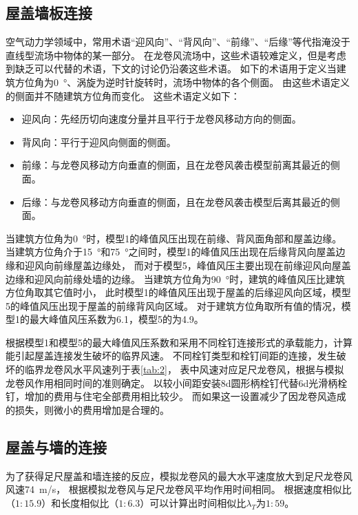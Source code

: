 \documentclass{ctexart}
\begin{document}
\subsection{屋盖墙板连接}
空气动力学领域中，常用术语“迎风向”、“背风向”、“前缘”、“后缘”等代指淹没于直线型流场中物体的某一部分。
在龙卷风流场中，这些术语较难定义，但是考虑到缺乏可以代替的术语，下文的讨论仍沿袭这些术语。
如下的术语用于定义当建筑方位角为\SI{0}{\degree}、涡旋为逆时针旋转时，流场中物体的各个侧面。
由这些术语定义的侧面并不随建筑方位角而变化。
这些术语定义如下：

\begin{itemize}
\item 迎风向：先经历切向速度分量并且平行于龙卷风移动方向的侧面。
\item 背风向：平行于迎风向侧面的侧面。
\item 前缘：与龙卷风移动方向垂直的侧面，且在龙卷风袭击模型前离其最近的侧面。
\item 后缘：与龙卷风移动方向垂直的侧面，且在龙卷风袭击模型后离其最近的侧面。
\end{itemize}

当建筑方位角为\SI{0}{\degree}时，模型1的峰值风压出现在前缘、背风面角部和屋盖边缘。
当建筑方位角介于\SI{15}{\degree}和\SI{75}{\degree}之间时，模型1的峰值风压出现在后缘背风向屋盖边缘和迎风向前缘屋盖边缘处，
而对于模型5，峰值风压主要出现在前缘迎风向屋盖边缘和迎风向前缘处墙的边缘。
当建筑方位角为\SI{90}{\degree}时，建筑的峰值风压比建筑方位角取其它值时小，
此时模型1的峰值风压出现于屋盖的后缘迎风向区域，模型5的峰值风压出现于屋盖的前缘背风向区域。
对于建筑方位角取所有值的情况，模型1的最大峰值风压系数为\num{6.1}，模型5的为\num{4.9}。

根据模型1和模型5的最大峰值风压系数和采用不同栓钉连接形式的承载能力，计算能引起屋盖连接发生破坏的临界风速。
不同栓钉类型和栓钉间距的连接，发生破坏的临界龙卷风水平风速列于表\ref{tab:2}，
表中风速对应足尺龙卷风，根据与模拟龙卷风作用相同时间的准则确定。
以较小间距安装8d圆形柄栓钉代替6d光滑柄栓钉，增加的费用与住宅全部费用相比较少。
而如果这一设置减少了因龙卷风造成的损失，则微小的费用增加是合理的。


\subsection{屋盖与墙的连接}
为了获得足尺屋盖和墙连接的反应，模拟龙卷风的最大水平速度放大到足尺龙卷风风速\SI{74}{m/s}，
根据模拟龙卷风与足尺龙卷风平均作用时间相同。
根据速度相似比（$1:15.9$）和长度相似比（$1:6.3$）可以计算出时间相似比$\lambda_T$为$1:59$。
\end{document}
